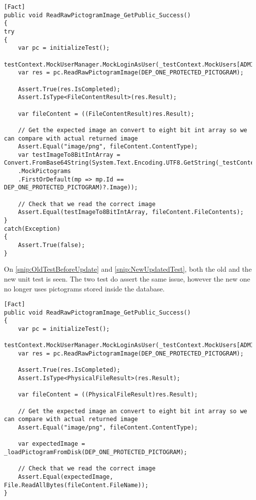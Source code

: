 \begin{lstlisting}[label={snip:OldTestBeforeUpdate}, caption={The old test after images are served from disk}, captionpos=b, language=CSharp] 
[Fact]
public void ReadRawPictogramImage_GetPublic_Success()
{
try
{
    var pc = initializeTest();
    testContext.MockUserManager.MockLoginAsUser(_testContext.MockUsers[ADMIN_DEP_ONE]);
    var res = pc.ReadRawPictogramImage(DEP_ONE_PROTECTED_PICTOGRAM);

    Assert.True(res.IsCompleted);
    Assert.IsType<FileContentResult>(res.Result);

    var fileContent = ((FileContentResult)res.Result);

    // Get the expected image an convert to eight bit int array so we can compare with actual returned image
    Assert.Equal("image/png", fileContent.ContentType);
    var testImageTo8BitIntArray = Convert.FromBase64String(System.Text.Encoding.UTF8.GetString(_testContext
    .MockPictograms
    .FirstOrDefault(mp => mp.Id == DEP_ONE_PROTECTED_PICTOGRAM)?.Image));

    // Check that we read the correct image
    Assert.Equal(testImageTo8BitIntArray, fileContent.FileContents);
}
catch(Exception)
{
    Assert.True(false);
}
\end{lstlisting}

On \autoref{snip:OldTestBeforeUpdate} and \autoref{snip:NewUpdatedTest}, both the old and the new unit test is seen. 
The two test do assert the same issue, however the new one no longer uses pictograms stored inside the database.

\begin{lstlisting}[label={snip:NewUpdatedTest}, caption={The updated test after images are served from disk)}, captionpos=b, language=CSharp] 
[Fact]
public void ReadRawPictogramImage_GetPublic_Success()
{
    var pc = initializeTest();
    testContext.MockUserManager.MockLoginAsUser(_testContext.MockUsers[ADMIN_DEP_ONE]);
    var res = pc.ReadRawPictogramImage(DEP_ONE_PROTECTED_PICTOGRAM);

    Assert.True(res.IsCompleted);
    Assert.IsType<PhysicalFileResult>(res.Result);

    var fileContent = ((PhysicalFileResult)res.Result);

    // Get the expected image an convert to eight bit int array so we can compare with actual returned image
    Assert.Equal("image/png", fileContent.ContentType);
            
    var expectedImage = _loadPictogramFromDisk(DEP_ONE_PROTECTED_PICTOGRAM);

    // Check that we read the correct image
    Assert.Equal(expectedImage, File.ReadAllBytes(fileContent.FileName));      
}
\end{lstlisting}

